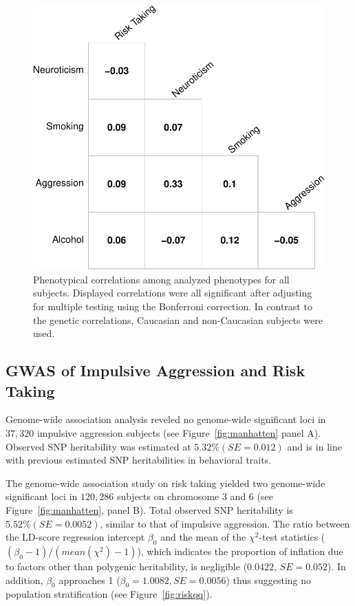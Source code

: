 \begin{figure}[htpb]
  \centering
  \includegraphics[width=0.6\linewidth]{ukb_assoc/figure/phenotype/corr_plot_ci.pdf} 
  \caption[Phenotypical correlations]{
    Phenotypical correlations among analyzed phenotypes for all subjects.
    Displayed correlations were all significant after adjusting for multiple testing using the Bonferroni correction.
    In contrast to the genetic correlations, Caucasian and non-Caucasian subjects were used.
  }\label{fig:corr_pheno}
\end{figure}

\subsection{GWAS of Impulsive Aggression and Risk Taking}
\label{sub:gwas}

Genome-wide association analysis reveled no genome-wide significant loci in $37,320$ impulsive aggression subjects (see Figure~\ref{fig:manhatten} panel A).
Observed SNP heritability was estimated at $5.32\% (SE=0.012)$ and is in line with previous estimated SNP heritabilities in behavioral traits.

The genome-wide association study on risk taking yielded two genome-wide significant loci in $120,286$ subjects on chromosome 3 and 6 (see Figure~\ref{fig:manhatten}, panel B).
Total observed SNP heritability is  $5.52\% (SE=0.0052)$, similar to that of impulsive aggression.
The ratio between the LD-score regression intercept $\beta_0$ and the mean of the $\chi^2$-test statistics ($(\beta_0 - 1)/(mean(\chi^2)-1)$),
which indicates the proportion of inflation due to factors other than polygenic heritability, is  negligible ($0.0422$, $SE=0.052$).
In addition, $\beta_0$ approaches 1 ($\beta_0=1.0082, SE=0.0056$) thus suggesting no population stratification (see Figure~\ref{fig:riskqq}).

